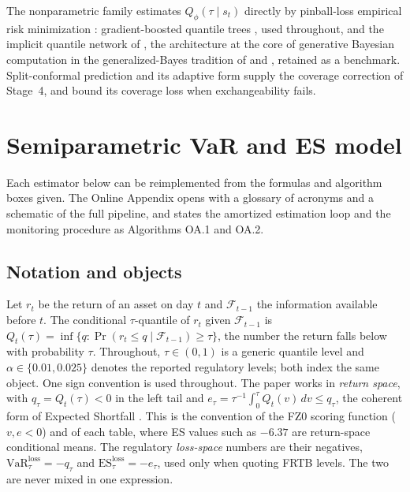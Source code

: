 \documentclass[11pt]{article}
\newcommand{\VaR}{\mathrm{VaR}}
\newcommand{\ES}{\mathrm{ES}}
\theoremstyle{remark}
\begin{document}
The nonparametric family estimates $Q_\phi(\tau \mid s_t)$ directly by pinball-loss empirical risk minimization \citep{koenker1978, steinwart2011}: gradient-boosted quantile trees \citep{friedman2001}, used throughout, and the implicit quantile network of \citet{dabney2018iqn}, the architecture at the core of generative Bayesian computation \citep{polson2023gbc, nareklishvili2025gqbp} in the generalized-Bayes tradition of \citet{jiang2008gibbs} and \citet{bissiri2016general}, retained as a benchmark. Split-conformal prediction \citep{vovk2005, lei2018, romano2019cqr} and its adaptive form \citep{gibbs2021aci} supply the coverage correction of Stage~4, and \citet{barber2023} bound its coverage loss when exchangeability fails.

\section{Semiparametric VaR and ES model}\label{sec:methods}

Each estimator below can be reimplemented from the formulas and
algorithm boxes given. The Online Appendix opens with a glossary of
acronyms and a schematic of the full pipeline, and states the amortized
estimation loop and the monitoring procedure as Algorithms OA.1 and
OA.2.

\subsection{Notation and objects}\label{sec:notation}

Let $r_t$ be the return of an asset on day $t$ and $\mathcal{F}_{t-1}$ the information available before $t$. The conditional $\tau$-quantile of $r_t$ given $\mathcal{F}_{t-1}$ is $Q_t(\tau) = \inf\{q : \Pr(r_t \le q \mid \mathcal{F}_{t-1}) \ge \tau\}$, the number the return falls below with probability $\tau$. Throughout, $\tau\in(0,1)$ is a generic quantile level and $\alpha\in\{0.01,0.025\}$ denotes the reported regulatory levels; both index the same object. One sign convention is used throughout. The paper works in \emph{return space}, with $q_\tau = Q_t(\tau) < 0$ in the left tail and $e_\tau = \tau^{-1}\int_0^{\tau} Q_t(v)\,dv \le q_\tau$, the coherent form of Expected Shortfall \citep{artzner1999, acerbitasche2002}. This is the convention of the FZ0 scoring function ($v,e<0$) \citep{fissler2016, patton2019} and of each table, where ES values such as $-6.37$ are return-space conditional means. The regulatory \emph{loss-space} numbers are their negatives, $\VaR^{\mathrm{loss}}_\tau=-q_\tau$ and $\ES^{\mathrm{loss}}_\tau=-e_\tau$, used only when quoting FRTB levels. The two are never mixed in one expression.
\end{document}
